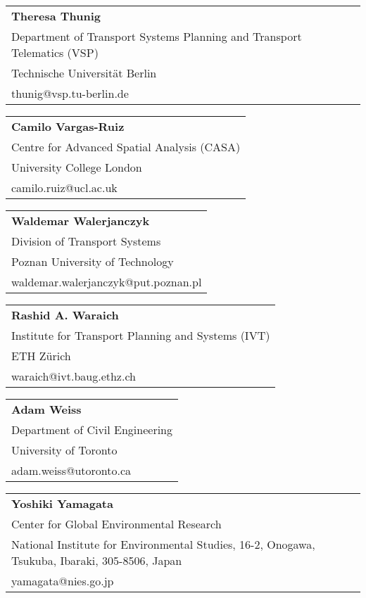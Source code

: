 \begin{tabular}[width=0.48\textwidth]{@{}l}
\textbf{Theresa Thunig} \\
Department of Transport Systems Planning and Transport Telematics (VSP) \\
Technische Universität Berlin \\
thunig@vsp.tu-berlin.de \\
\end{tabular}

\begin{tabular}[width=0.48\textwidth]{@{}l}
\textbf{Camilo Vargas-Ruiz} \\
Centre for Advanced Spatial Analysis (CASA) \\
University College London \\
camilo.ruiz@ucl.ac.uk \\
\end{tabular}

\begin{tabular}[width=0.48\textwidth]{@{}l}
\textbf{Waldemar Walerjanczyk} \\
Division of Transport Systems \\
Poznan University of Technology \\
waldemar.walerjanczyk@put.poznan.pl \\
\end{tabular}

\begin{tabular}[width=0.48\textwidth]{@{}l}
\textbf{Rashid A. Waraich} \\
Institute for Transport Planning and Systems (IVT) \\
ETH Zürich \\
waraich@ivt.baug.ethz.ch \\
\end{tabular}

\begin{tabular}[width=0.48\textwidth]{@{}l}
\textbf{Adam Weiss} \\
Department of Civil Engineering \\
University of Toronto \\
adam.weiss@utoronto.ca  \\
\end{tabular}

\begin{tabular}[width=0.48\textwidth]{@{}l}
\textbf{Yoshiki Yamagata} \\
Center for Global Environmental Research \\
National Institute for Environmental Studies, 16-2, Onogawa, Tsukuba, Ibaraki, 305-8506, Japan \\
yamagata@nies.go.jp  \\
\end{tabular}

